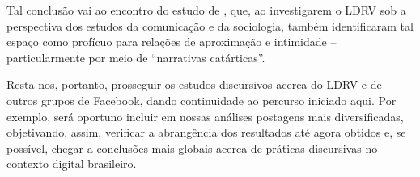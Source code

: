 \documentclass{textolivre}
\begin{document}
Tal conclusão vai ao encontro do estudo de \textcite{queiroz2019}, que, ao investigarem o LDRV sob a perspectiva dos estudos da comunicação e da sociologia, também identificaram tal espaço como profícuo para relações de aproximação e intimidade – particularmente por meio de “narrativas catárticas”.

Resta-nos, portanto, prosseguir os estudos discursivos acerca do LDRV e de outros grupos de Facebook, dando continuidade ao percurso iniciado aqui. Por exemplo, será oportuno incluir em nossas análises postagens mais diversificadas, objetivando, assim, verificar a abrangência dos resultados até agora obtidos e, se possível, chegar a conclusões mais globais acerca de práticas discursivas no contexto digital brasileiro.

\printbibliography\label{sec-bib}
\end{document}
